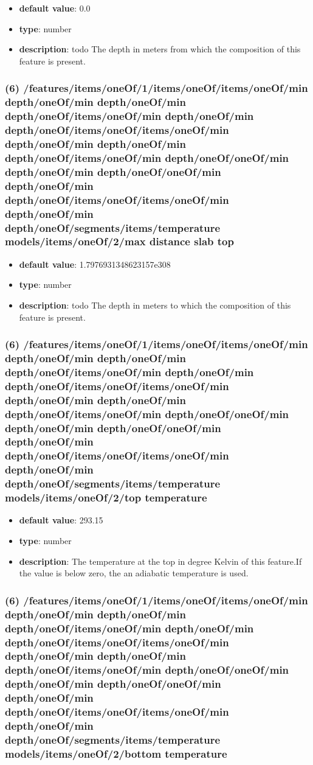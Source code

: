 \begin{itemize}[leftmargin=6em]\item {\bf default value}: 0.0
\item {\bf type}: number
\item {\bf description}: todo The depth in meters from which the composition of this feature is present.
\end{itemize}\subsubsection{(6) /features/items/oneOf/1/items/oneOf/items/oneOf/min depth/oneOf/min depth/oneOf/min depth/oneOf/items/oneOf/min depth/oneOf/min depth/oneOf/items/oneOf/items/oneOf/min depth/oneOf/min depth/oneOf/min depth/oneOf/items/oneOf/min depth/oneOf/oneOf/min depth/oneOf/min depth/oneOf/oneOf/min depth/oneOf/min depth/oneOf/items/oneOf/items/oneOf/min depth/oneOf/min depth/oneOf/segments/items/temperature models/items/oneOf/2/max distance slab top}
\begin{itemize}[leftmargin=6em]\item {\bf default value}: 1.7976931348623157e308
\item {\bf type}: number
\item {\bf description}: todo The depth in meters to which the composition of this feature is present.
\end{itemize}\subsubsection{(6) /features/items/oneOf/1/items/oneOf/items/oneOf/min depth/oneOf/min depth/oneOf/min depth/oneOf/items/oneOf/min depth/oneOf/min depth/oneOf/items/oneOf/items/oneOf/min depth/oneOf/min depth/oneOf/min depth/oneOf/items/oneOf/min depth/oneOf/oneOf/min depth/oneOf/min depth/oneOf/oneOf/min depth/oneOf/min depth/oneOf/items/oneOf/items/oneOf/min depth/oneOf/min depth/oneOf/segments/items/temperature models/items/oneOf/2/top temperature}
\begin{itemize}[leftmargin=6em]\item {\bf default value}: 293.15
\item {\bf type}: number
\item {\bf description}: The temperature at the top in degree Kelvin of this feature.If the value is below zero, the an adiabatic temperature is used.
\end{itemize}\subsubsection{(6) /features/items/oneOf/1/items/oneOf/items/oneOf/min depth/oneOf/min depth/oneOf/min depth/oneOf/items/oneOf/min depth/oneOf/min depth/oneOf/items/oneOf/items/oneOf/min depth/oneOf/min depth/oneOf/min depth/oneOf/items/oneOf/min depth/oneOf/oneOf/min depth/oneOf/min depth/oneOf/oneOf/min depth/oneOf/min depth/oneOf/items/oneOf/items/oneOf/min depth/oneOf/min depth/oneOf/segments/items/temperature models/items/oneOf/2/bottom temperature}
